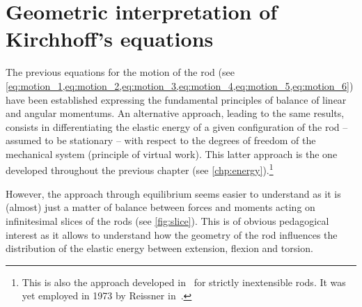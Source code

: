 \section{Geometric interpretation of Kirchhoff's equations}\label{sec:geointerp}

The previous equations for the motion of the rod (see \cref{eq:motion_1,eq:motion_2,eq:motion_3,eq:motion_4,eq:motion_5,eq:motion_6}) have been established expressing the fundamental principles of balance of linear and angular momentums. An alternative approach, leading to the same results, consists in differentiating the elastic energy of a given configuration of the rod -- assumed to be stationary -- with respect to the degrees of freedom of the mechanical system (principle of virtual work). This latter approach is the one developed throughout the previous chapter (see \cref{chp:energy}).\footnote{This is also the approach developed in~\cite{Audoly2010} for strictly inextensible rods. It was yet employed in 1973 by Reissner in~\cite{Reissner1973}.} 

However, the approach through equilibrium seems easier to understand as it is (almost) just a matter of balance between forces and moments acting on infinitesimal slices of the rods (see \cref{fig:slice}). This is of obvious pedagogical interest as it allows to understand how the geometry of the rod influences the distribution of the elastic energy between extension, flexion and torsion.

